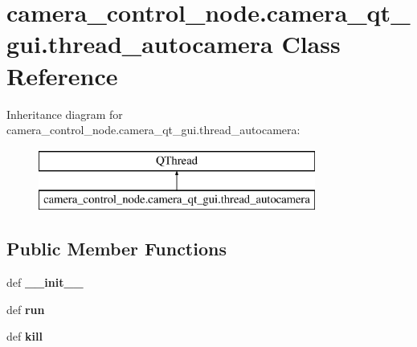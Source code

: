 \hypertarget{classcamera__control__node_1_1camera__qt__gui_1_1thread__autocamera}{\section{camera\-\_\-control\-\_\-node.\-camera\-\_\-qt\-\_\-gui.\-thread\-\_\-autocamera Class Reference}
\label{classcamera__control__node_1_1camera__qt__gui_1_1thread__autocamera}
}
Inheritance diagram for camera\-\_\-control\-\_\-node.\-camera\-\_\-qt\-\_\-gui.\-thread\-\_\-autocamera\-:\begin{figure}[H]
\begin{center}
\leavevmode
\includegraphics[height=2.000000cm]{classcamera__control__node_1_1camera__qt__gui_1_1thread__autocamera}
\end{center}
\end{figure}
\subsection*{Public Member Functions}
\begin{DoxyCompactItemize}
\item 
\hypertarget{classcamera__control__node_1_1camera__qt__gui_1_1thread__autocamera_af345ff75eaf43936dae83e24247846c7}{def {\bfseries \-\_\-\-\_\-init\-\_\-\-\_\-}}\label{classcamera__control__node_1_1camera__qt__gui_1_1thread__autocamera_af345ff75eaf43936dae83e24247846c7}

\item 
\hypertarget{classcamera__control__node_1_1camera__qt__gui_1_1thread__autocamera_a4be49c185735acde1c4fb7a37cd4c629}{def {\bfseries run}}\label{classcamera__control__node_1_1camera__qt__gui_1_1thread__autocamera_a4be49c185735acde1c4fb7a37cd4c629}

\item 
\hypertarget{classcamera__control__node_1_1camera__qt__gui_1_1thread__autocamera_ac4eb62e38449c8be081de332cc581209}{def {\bfseries kill}}\label{classcamera__control__node_1_1camera__qt__gui_1_1thread__autocamera_ac4eb62e38449c8be081de332cc581209}

\end{DoxyCompactItemize}
